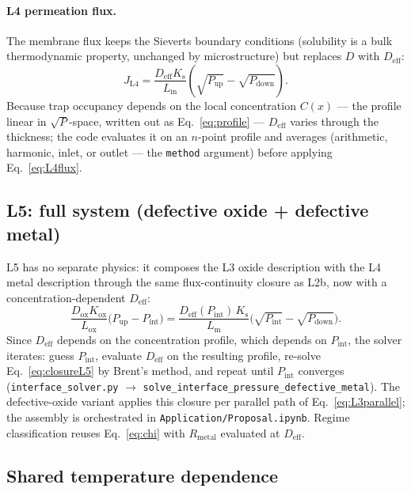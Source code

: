 \documentclass[11pt,a4paper]{article}
\newcommand{\Pup}{P_{\mathrm{up}}}
\newcommand{\Pdown}{P_{\mathrm{down}}}
\newcommand{\Pint}{P_{\mathrm{int}}}
\newcommand{\Ks}{K_{\mathrm{s}}}
\newcommand{\Kox}{K_{\mathrm{ox}}}
\newcommand{\Dox}{D_{\mathrm{ox}}}
\newcommand{\Deff}{D_{\mathrm{eff}}}
\newcommand{\Lm}{L_{\mathrm{m}}}
\newcommand{\Lox}{L_{\mathrm{ox}}}
\newcommand{\Rmet}{R_{\mathrm{metal}}}
\newcommand{\code}[1]{\texttt{#1}}
\begin{document}
\paragraph{L4 permeation flux.} The membrane flux keeps the Sieverts boundary
conditions (solubility is a bulk thermodynamic property, unchanged by
microstructure) but replaces $D$ with $\Deff$:
\begin{equation}
  J_{\mathrm{L4}} = \frac{\Deff \Ks}{\Lm}\left(\sqrt{\Pup} - \sqrt{\Pdown}\right).
  \label{eq:L4flux}
\end{equation}
Because trap occupancy depends on the local concentration $C(x)$ --- the
profile linear in $\sqrt{P}$-space, written out as Eq.~\eqref{eq:profile} ---
$\Deff$ varies through the thickness; the code evaluates it on an $n$-point
profile and averages (arithmetic, harmonic, inlet, or outlet --- the
\code{method} argument) before applying Eq.~\eqref{eq:L4flux}.

\subsection{L5: full system (defective oxide + defective metal)}

L5 has no separate physics: it composes the L3 oxide description with the L4
metal description through the same flux-continuity closure as L2b, now with a
concentration-dependent $\Deff$:
\begin{equation}
  \frac{\Dox\Kox}{\Lox}\bigl(\Pup - \Pint\bigr)
  =
  \frac{\Deff(\Pint)\,\Ks}{\Lm}\bigl(\sqrt{\Pint} - \sqrt{\Pdown}\bigr).
  \label{eq:closureL5}
\end{equation}
Since $\Deff$ depends on the concentration profile, which depends on $\Pint$,
the solver iterates: guess $\Pint$, evaluate $\Deff$ on the resulting profile,
re-solve Eq.~\eqref{eq:closureL5} by Brent's method, and repeat until $\Pint$
converges (\code{interface\_solver.py} $\rightarrow$
\code{solve\_interface\_pressure\_defective\_metal}). The defective-oxide
variant applies this closure per parallel path of Eq.~\eqref{eq:L3parallel};
the assembly is orchestrated in \code{Application/Proposal.ipynb}. Regime
classification reuses Eq.~\eqref{eq:chi} with $\Rmet$ evaluated at $\Deff$.

\subsection{Shared temperature dependence}
\end{document}

